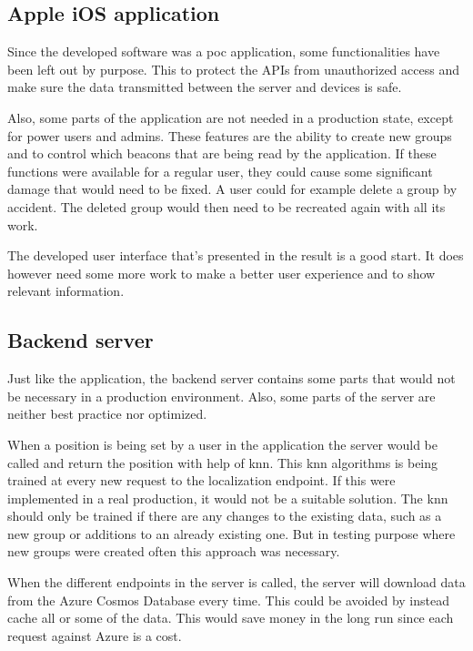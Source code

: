 \subsection{Apple iOS application}
Since the developed software was a \acrshort{poc} application, some functionalities have been left out by purpose.
This to protect the APIs from unauthorized access and make sure the data transmitted between the server and devices is safe.

\bigskip

Also, some parts of the application are not needed in a production state, except for power users and admins.
These features are the ability to create new groups and to control which beacons that are being read by the application.
If these functions were available for a regular user, they could cause some significant damage that would need to be fixed.
A user could for example delete a group by accident.
The deleted group would then need to be recreated again with all its work. 

\bigskip

The developed user interface that's presented in the result is a good start.
It does however need some more work to make a better user experience and to show relevant information.


\subsection{Backend server}
Just like the application, the backend server contains some parts that would not be necessary in a production environment.
Also, some parts of the server are neither best practice nor optimized.

\bigskip

When a position is being set by a user in the application the server would be called and return the position with help of \acrfull{knn}.
This \acrshort{knn} algorithms is being trained at every new request to the localization endpoint.
If this were implemented in a real production, it would not be a suitable solution.
The \acrshort{knn} should only be trained if there are any changes to the existing data, such as a new group or additions to an already existing one.
But in testing purpose where new groups were created often this approach was necessary.

\bigskip

When the different endpoints in the server is called, the server will download data from the Azure Cosmos Database every time. 
This could be avoided by instead cache all or some of the data.
This would save money in the long run since each request against Azure is a cost.



